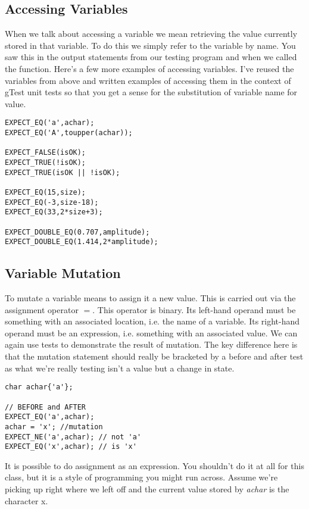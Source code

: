 \documentclass[]{tufte-handout}
\begin{document}
\subsection{Accessing Variables}

When we talk about accessing a variable we mean retrieving the value currently stored in that variable. To do this we simply refer to the variable by name. You saw this in the output statements from our testing program and when we called the function.  Here's a few more examples of accessing variables.  I've reused the variables from above and written examples of accessing them in the context of gTest unit tests so that you get a sense for the substitution of variable name for value.

\begin{verbatim}
EXPECT_EQ('a',achar);
EXPECT_EQ('A',toupper(achar));

EXPECT_FALSE(isOK);
EXPECT_TRUE(!isOK);
EXPECT_TRUE(isOK || !isOK);

EXPECT_EQ(15,size);
EXPECT_EQ(-3,size-18);
EXPECT_EQ(33,2*size+3);

EXPECT_DOUBLE_EQ(0.707,amplitude);
EXPECT_DOUBLE_EQ(1.414,2*amplitude);
\end{verbatim}

\subsection{Variable Mutation}

To mutate a variable means to assign it a new value. This is carried out via the assignment operator $=$. This operator is binary. Its left-hand operand must be something with an associated location, i.e. the name of a variable. Its  right-hand operand must be an expression, i.e. something with an associated value. We can again use tests to demonstrate the result of mutation. The key difference here is that the mutation statement should really be bracketed by a before and after test as what we're really testing isn't a value but a change in state.

\begin{verbatim}
char achar{'a'};

// BEFORE and AFTER
EXPECT_EQ('a',achar);
achar = 'x'; //mutation
EXPECT_NE('a',achar); // not 'a'
EXPECT_EQ('x',achar); // is 'x'
\end{verbatim}

It is possible to do assignment as an expression. You shouldn't do it at all for this class, but it is a style of programming you might run across. Assume we're picking up right where we left off and the current value stored by \textit{achar} is the character x.
\end{document}
